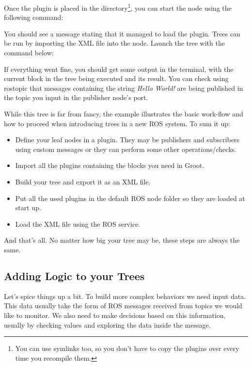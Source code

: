 \documentclass[a4paper,12pt]{article}
\begin{document}
Once the plugin is placed in the directory\footnote{You can use symlinks too, so you don't have to copy the plugins over every time you recompile them.}, you can start the node using the following command:



You should see a message stating that it managed to load the plugin. Trees can be run by importing the XML file into the node. Launch the tree with the command below:



If everything went fine, you should get some output in the terminal, with the current block in the tree being executed and its result. You can check using rostopic that messages containing the string \textit{Hello World!} are being published in the topic you input in the publisher node's port.

While this tree is far from fancy, the example illustrates the basic work-flow and how to proceed when introducing trees in a new ROS system. To sum it up:

\begin{itemize}
\item Define your leaf nodes in a plugin. They may be publishers and subscribers using custom messages or they can perform some other operations/checks.
\item Import all the plugins containing the blocks you need in Groot.
\item Build your tree and export it as an XML file.
\item Put all the used plugins in the default ROS node folder so they are loaded at start up.
\item Load the XML file using the ROS service.
\end{itemize}

And that's all. No matter how big your tree may be, these steps are always the same.

\subsection{Adding Logic to your Trees}
\label{subsec:trees-logic}

Let's spice things up a bit. To build more complex behaviors we need input data. This data usually take the form of ROS messages received from topics we would like to monitor. We also need to make decisions based on this information, usually by checking values and exploring the data inside the message.
\end{document}
